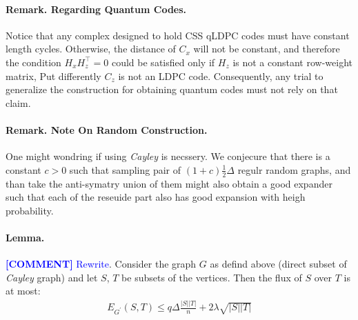 \documentclass{article}
\newcommand{\commentt}[1]{\textcolor{blue}{ \textbf{[COMMENT]} #1}}
\newcommand{\ctt}[1]{\commentt{#1}}
\begin{document}
\begin{multicols*}{2}
  \paragraph{Remark. Regarding Quantum Codes.} Notice that any complex designed to hold CSS qLDPC codes must have constant length cycles. Otherwise, the distance of $C_{x}$ will not be constant, and therefore the condition $H_{x}H_{z}^{\top} =0$ could be satisfied only if $H_{z}$ is not a constant row-weight matrix, Put differently $C_{z}$ is not an LDPC code. Consequently, any trial to generalize the construction for obtaining quantum codes must not rely on that claim.    

  \paragraph{Remark. Note On Random Construction.} One might wondring if using \emph{Cayley} is necssery. We conjecure that there is a constant $c > 0$ such that sampling pair of  $\left( 1 + c \right)\frac{1}{2}\Delta$ regulr random graphs, and than take the anti-symatry union of them might also obtain a good expander such that each of the reseuide part also has good expansion with heigh probability.  
  \paragraph{Lemma.} \ctt{Rewrite}. Consider the graph $G$ as defind above (direct subset of \emph{Cayley} graph) and let $S$, $T$ be subsets of the vertices. Then the flux of $S$ over $T$ is at most: 
  \begin{equation*}
    \begin{split}
      E_{G^{\prime}}(S,T) \le q\Delta\frac{|S||T|}{n} + 2\lambda\sqrt{|S||T|} 
    \end{split}
  \end{equation*}

\end{multicols*}
\end{document}
